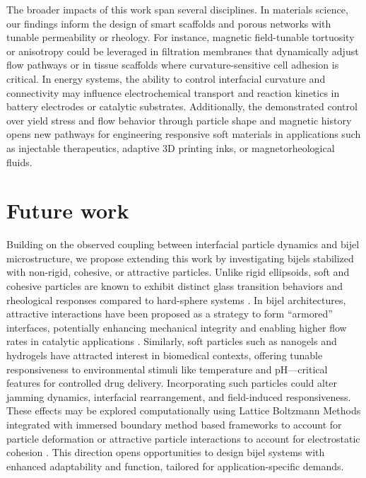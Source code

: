 The broader impacts of this work span several disciplines. In materials science, our findings inform the design of smart scaffolds and porous 
networks with tunable permeability or rheology. For instance, magnetic field-tunable tortuosity or anisotropy could be leveraged in filtration 
membranes that dynamically adjust flow pathways or in tissue scaffolds where curvature-sensitive cell adhesion is critical. In energy systems, 
the ability to control interfacial curvature and connectivity may influence electrochemical transport and reaction kinetics in battery electrodes 
or catalytic substrates. Additionally, the demonstrated control over yield stress and flow behavior through particle shape and magnetic history 
opens new pathways for engineering responsive soft materials in applications such as injectable therapeutics, adaptive 3D printing inks, or 
magnetorheological fluids.

\section{Future work}

Building on the observed coupling between interfacial particle dynamics and bijel microstructure, we propose extending 
this work by investigating bijels stabilized with non-rigid, cohesive, or attractive particles. Unlike rigid ellipsoids, 
soft and cohesive particles are known to exhibit distinct glass transition behaviors and rheological responses compared 
to hard-sphere systems \cite{weeks_introduction_2017, torquato_jammed_2010}. In bijel architectures, attractive interactions have been 
proposed as a strategy to form “armored” interfaces, potentially enhancing mechanical integrity and enabling higher flow rates in catalytic 
applications \cite{boakye-ansah_controlling_2020}. 
Similarly, soft particles such as nanogels and hydrogels have attracted interest in biomedical contexts, offering tunable responsiveness 
to environmental stimuli like temperature and pH—critical features for controlled drug delivery. Incorporating such particles 
could alter jamming dynamics, interfacial rearrangement, and field-induced responsiveness. These effects may be 
explored computationally using Lattice Boltzmann Methods integrated with immersed boundary method based frameworks to account for
particle deformation or attractive particle interactions to account for electrostatic cohesion \cite{silva_lattice_2024}. This direction opens opportunities 
to design bijel systems with enhanced adaptability and function, tailored for application-specific demands.


